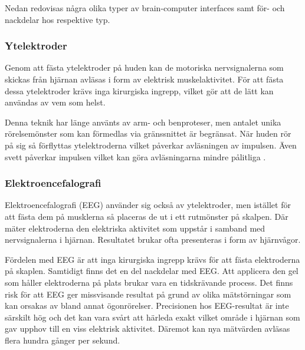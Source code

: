 \documentclass[12pt, a4paper]{article}
\begin{document}
Nedan redovisas några olika typer av brain-computer interfaces samt för- och nackdelar hos respektive typ.


\subsubsection{Ytelektroder}

Genom att fästa ytelektroder på huden kan de motoriska nervsignalerna som skickas från hjärnan avläsas i form av elektrisk muskelaktivitet. För att fästa dessa ytelektroder krävs inga kirurgiska ingrepp, vilket gör att de lätt kan användas av vem som helst.

Denna teknik har länge använts av arm- och benproteser, men antalet unika rörelsemönster som kan förmedlas via gränssnittet är begränsat. När huden rör på sig så förflyttas ytelektroderna vilket påverkar avläsningen av impulsen. Även svett påverkar impulsen vilket kan göra avläsningarna mindre pålitliga \cite{prosthetic_operation}.


\subsubsection{Elektroencefalografi}

Elektroencefalografi (EEG) använder sig också av ytelektroder, men istället för att fästa dem på musklerna så placeras de ut i ett rutmönster på skalpen. Där mäter elektroderna den elektriska aktivitet som uppstår i samband med nervsignalerna i hjärnan. Resultatet brukar ofta presenteras i form av hjärnvågor.

Fördelen med EEG är att inga kirurgiska ingrepp krävs för att fästa elektroderna på skaplen. Samtidigt finns det en del nackdelar med EEG. Att applicera den gel som håller elektroderna på plats brukar vara en tidskrävande process. Det finns risk för att EEG ger missvisande resultat på grund av olika mätstörningar som kan orsakas av bland annat ögonrörelser. Precisionen hos EEG-resultat är inte särskilt hög och det kan vara svårt att härleda exakt vilket område i hjärnan som gav upphov till en viss elektrisk aktivitet. Däremot kan nya mätvärden avläsas flera hundra gånger per sekund.

\end{document}

